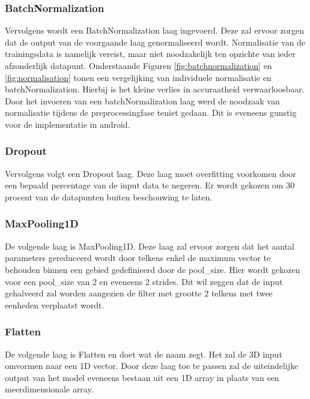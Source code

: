 \subsubsection{BatchNormalization}
Vervolgens wordt een BatchNormalization laag ingevoerd. Deze zal ervoor zorgen dat de output van de voorgaande laag genormaliseerd wordt. 
Normalisatie van de trainingsdata is namelijk vereist, maar niet noodzakelijk ten opzichte van ieder afzonderlijk datapunt. Onderstaande Figuren \ref{fig:batchnormalization} en \ref{fig:normalisation} tonen een vergelijking van individuele normalisatie en batchNormalization. Hierbij is het kleine verlies in accuraatheid verwaarloosbaar. Door het invoeren van een batchNormalization laag werd de noodzaak van normalisatie tijdens de preprocessingfase teniet gedaan. Dit is eveneens gunstig voor de implementatie in android.

\begin{figure}[!htpd]
\centering
\begin{floatrow}
\end{floatrow}
\end{figure}

\subsubsection{Dropout}
Vervolgens volgt een Dropout laag. Deze laag moet overfitting voorkomen door een bepaald percentage van de input data te negeren. Er wordt gekozen om 30 procent van de datapunten buiten beschouwing te laten.

\subsubsection{MaxPooling1D}
De volgende laag is MaxPooling1D. Deze laag zal ervoor zorgen dat het aantal parameters gereduceerd wordt door telkens enkel de maximum vector te behouden binnen een gebied gedefinieerd door de pool\_size. Hier wordt gekozen voor een pool\_size van 2 en eveneens 2 strides. Dit wil zeggen dat de input gehalveerd zal worden aangezien de filter met grootte 2 telkens met twee eenheden verplaatst wordt.

\subsubsection{Flatten}
De volgende laag is Flatten en doet wat de naam zegt. Het zal de 3D input omvormen naar een 1D vector. Door deze laag toe te passen zal de uiteindelijke output van het model eveneens bestaan uit een 1D array in plaats van een meerdimensionale array.

